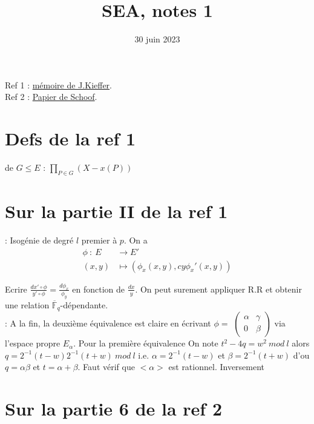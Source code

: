 \documentclass[12pt]{article}
\title{SEA, notes 1}
\date{30 juin 2023}
\begin{document}
\tableofcontents
\maketitle
\noindent Ref 1 : \href{https://scholar.harvard.edu/files/kieffer/files/sea.pdf}{mémoire de J.Kieffer}.\\
Ref 2 : \href{https://www.mat.uniroma2.it/~schoof/ctg.pdf}{Papier de Schoof}.

\section{Defs de la ref 1}
\indent {} de $G\leq E$ : $\prod_{P\in G}(X-x(P))$
\section{Sur la partie II de la ref 1}
\indent {} : Isogénie de degré $l$ premier à $p$. On a 
\begin{align*}
    \phi~:~E&\to E'\\
    (x,y)&\mapsto (\phi_x(x,y), cy\phi_x'(x,y))
\end{align*}

\noindent Ecrire $\frac{dx'\circ\phi}{y'\circ\phi}=\frac{d\phi_x}{\phi_y}$ en fonction de $\frac{dx}{y}$.
On peut surement appliquer R.R et obtenir une relation $\overline{\mathbb{F}}_q$-dépendante.
\\ \newline
{} : A la fin, la deuxième équivalence est claire en écrivant $\phi=$ 
$\begin{pmatrix} 
    \alpha & \gamma\\
    0 & \beta
\end{pmatrix}$
via l'espace propre $E_{\alpha}$. Pour la première équivalence On
note $t^2-4q=w^2~mod~l$ alors $q=2^{-1}(t-w)2^{-1}(t+w)~mod~l$ i.e. $\alpha=2^{-1}(t-w)$
et $\beta=2^{-1}(t+w)$ d'ou $q=\alpha\beta$ et $t=\alpha+\beta$. Faut vérif que $<\alpha>$ est rationnel.
Inversement 


\section{Sur la partie 6 de la ref 2}
\end{document}
